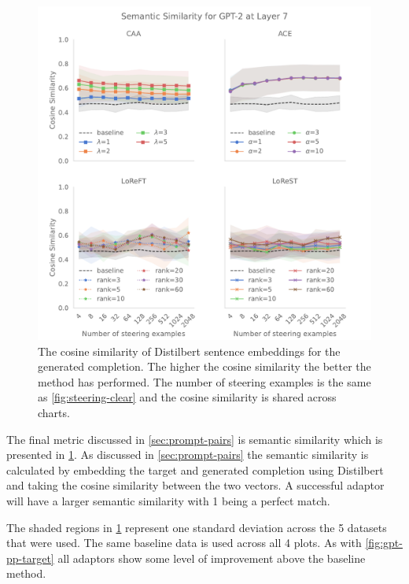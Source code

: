 \begin{figure}
    \centering
    \captionsetup{width=.9\textwidth}
    \includegraphics[width=\textwidth]{figures/gpt2_7_similarity.pdf}
    \caption{
        The cosine similarity of Distilbert \citep{distilbert} sentence embeddings for the generated completion.
        The higher the cosine similarity the better the method has performed.
        The number of steering examples is the same as \cref{fig:steering-clear} and the cosine similarity is shared across charts.
    }
    \label{fig:gpt-pp-sim} \end{figure}

The final metric discussed in \cref{sec:prompt-pairs} is semantic similarity which is presented in \cref{fig:gpt-pp-sim}.
As discussed in \cref{sec:prompt-pairs} the semantic similarity is calculated by embedding the target and generated completion using Distilbert \citep{distilbert} and taking the cosine similarity between the two vectors.
A successful adaptor will have a larger semantic similarity with 1 being a perfect match.

The shaded regions in \cref{fig:gpt-pp-sim} represent one standard deviation across the 5 datasets that were used.
The same baseline data is used across all 4 plots.
As with \cref{fig:gpt-pp-target} all adaptors show some level of improvement above the baseline method.

